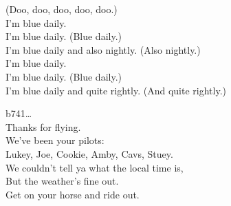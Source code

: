 
(Doo, doo, doo, doo, doo.) \\
I'm blue daily. \\
I'm blue daily. (Blue daily.) \\
I'm blue daily and also nightly. (Also nightly.) \\
I'm blue daily. \\
I'm blue daily. (Blue daily.) \\
I'm blue daily and quite rightly. (And quite rightly.) \\


b741… \\

Thanks for flying. \\
We've been your pilots: \\
Lukey, Joe, Cookie, Amby, Cavs, Stuey. \\

We couldn't tell ya what the local time is, \\
But the weather's fine out. \\
Get on your horse and ride out. \\
